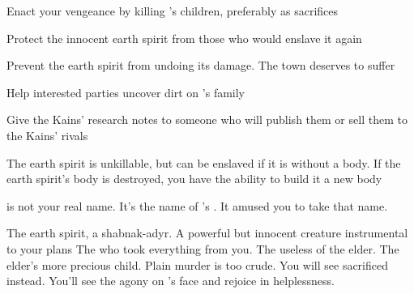 \documentclass[char]{Pestilence}
\begin{document}
\begin{itemz}[Goals]
	\item Enact your vengeance by killing \cElder{}'s children, preferably as sacrifices
	\item Protect the innocent earth spirit from those who would enslave it again
	\item Prevent the earth spirit from undoing its damage. The town deserves to suffer
	\item Help interested parties uncover dirt on \cElder{}'s family
	\item Give the Kains' research notes to someone who will publish them or sell them to the Kains' rivals

\end{itemz}

\begin{itemz}[Notes]
	\item The earth spirit is unkillable, but can be enslaved if it is without a body. If the earth spirit's body is destroyed, you have the ability to build it a new body
	\item \cShaman{} is not your real name. It's the name of \cElder{\intro}'s \cElderSpouse{\spouse}. It amused you to take that name. 
\end{itemz}

\begin{contacts}
	\contact{\cPlaguebearer{}} The earth spirit, a shabnak-adyr. A powerful but innocent creature instrumental to your plans
	\contact{\cElder{}} The \cElder{\human} who took everything from you. 
	\contact{\cApprentice{}} The useless \cApprentice{\offspring} of the elder.
	\contact{\cRebel{}} The elder's more precious child. Plain murder is too crude. You will see \cRebel{\them} sacrificed instead. You'll see the agony on \cElder{}'s face and rejoice in \cElder{\their} helplessness.
\end{contacts}
\end{document}
